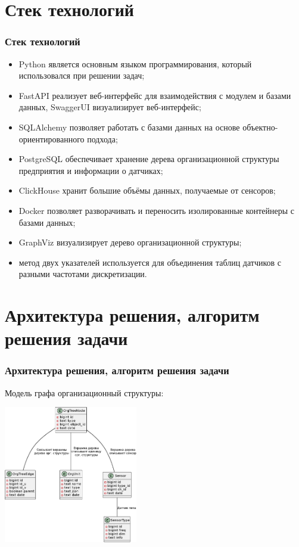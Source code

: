 \documentclass[pdf, hyperref={unicode}, aspectratio=169]{beamer}
\begin{document}
\section{Стек технологий}
\begin{frame}
	\frametitle{Стек технологий}
	
	\begin{itemize}
		\item Python является основным языком программирования, который использовался при решении задач;
		\item FastAPI реализует веб-интерфейс для взаимодействия с модулем и базами данных, SwaggerUI визуализирует веб-интерфейс;
		\item SQLAlchemy позволяет работать с базами данных на основе объектно-ориентированного подхода;
		\item PostgreSQL обеспечивает хранение дерева организационной структуры предприятия и информации о датчиках;
		\item ClickHouse хранит большие объёмы данных, получаемые от сенсоров;
		\item Docker позволяет разворачивать и переносить изолированные контейнеры с базами данных;
		\item GraphViz визуализирует дерево организационной структуры;
		\item метод двух указателей используется для объединения таблиц датчиков с разными частотами дискретизации.
	\end{itemize}
\end{frame}


\section{Архитектура решения, алгоритм решения задачи}
\begin{frame}
	\frametitle{Архитектура решения, алгоритм решения задачи}
	
	Модель графа организационный структуры:
	
	\begin{center}
		\includegraphics[height = 6cm]{datamodel.eps}
	\end{center}
\end{frame}
\end{document}
